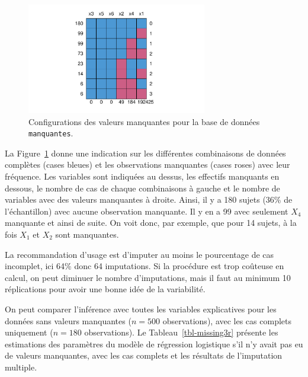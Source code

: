 \documentclass[
  11pt,
  letterpaper,
]{scrbook}
\theoremstyle{definition}
\theoremstyle{remark}
\begin{document}
\begin{figure}[ht!]

{\centering \includegraphics[width=0.7\textwidth,height=\textheight]{./07-donneesmanquantes_files/figure-pdf/fig-manquantes2-1.pdf}

}

\caption{\label{fig-manquantes2}Configurations des valeurs manquantes
pour la base de données \texttt{manquantes}.}

\end{figure}

La Figure~\ref{fig-manquantes2} donne une indication sur les différentes
combinaisons de données complètes (cases bleues) et les observations
manquantes (cases roses) avec leur fréquence. Les variables sont
indiquées au dessus, les effectifs manquants en dessous, le nombre de
cas de chaque combinaisons à gauche et le nombre de variables avec des
valeurs manquantes à droite. Ainsi, il y a 180 sujets (36\% de
l'échantillon) avec aucune observation manquante. Il y en a 99 avec
seulement \(X_4\) manquante et ainsi de suite. On voit donc, par
exemple, que pour 14 sujets, à la fois \(X_1\) et \(X_2\) sont
manquantes.

La recommandation d'usage est d'imputer au moins le pourcentage de cas
incomplet, ici 64\% donc 64 imputations. Si la procédure est trop
coûteuse en calcul, on peut diminuer le nombre d'imputations, mais il
faut au minimum 10 réplications pour avoir une bonne idée de la
variabilité.

On peut comparer l'inférence avec toutes les variables explicatives pour
les données sans valeurs manquantes (\(n=500\) observations), avec les
cas complets uniquement (\(n=180\) observations). Le
Tableau~\ref{tbl-missing3r} présente les estimations des paramètres du
modèle de régression logistique s'il n'y avait pas eu de valeurs
manquantes, avec les cas complets et les résultats de l'imputation
multiple.
\end{document}
